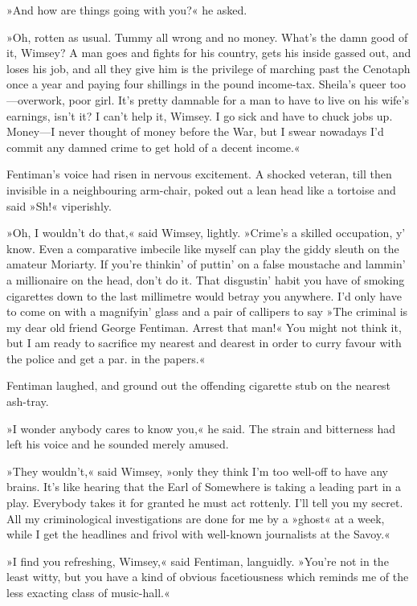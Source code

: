 »And how are things going with you?« he asked.

»Oh, rotten as usual. Tummy all wrong and no money. What's the damn good of it, Wimsey? A man goes and fights for his country, gets his inside gassed out, and loses his job, and all they give him is the privilege of marching past the Cenotaph once a year and paying four shillings in the pound income-tax. Sheila's queer too—overwork, poor girl. It's pretty damnable for a man to have to live on his wife's earnings, isn't it? I can't help it, Wimsey. I go sick and have to chuck jobs up. Money—I never thought of money before the War, but I swear nowadays I'd commit any damned crime to get hold of a decent income.«

Fentiman's voice had risen in nervous excitement. A shocked veteran, till then invisible in a neighbouring arm-chair, poked out a lean head like a tortoise and said »Sh!« viperishly.

»Oh, I wouldn't do that,« said Wimsey, lightly. »Crime's a skilled occupation, y' know. Even a comparative imbecile like myself can play the giddy sleuth on the amateur Moriarty. If you're thinkin' of puttin' on a false moustache and lammin' a millionaire on the head, don't do it. That disgustin' habit you have of smoking cigarettes down to the last millimetre would betray you anywhere. I'd only have to come on with a magnifyin' glass and a pair of callipers to say »The criminal is my dear old friend George Fentiman. Arrest that man!« You might not think it, but I am ready to sacrifice my nearest and dearest in order to curry favour with the police and get a par. in the papers.«

Fentiman laughed, and ground out the offending cigarette stub on the nearest ash-tray.

»I wonder anybody cares to know you,« he said. The strain and bitterness had left his voice and he sounded merely amused.

»They wouldn't,« said Wimsey, »only they think I'm too well-off to have any brains. It's like hearing that the Earl of Somewhere is taking a leading part in a play. Everybody takes it for granted he must act rottenly. I'll tell you my secret. All my criminological investigations are done for me by a »ghost« at  a week, while I get the headlines and frivol with well-known journalists at the Savoy.«

»I find you refreshing, Wimsey,« said Fentiman, languidly. »You're not in the least witty, but you have a kind of obvious facetiousness which reminds me of the less exacting class of music-hall.«

